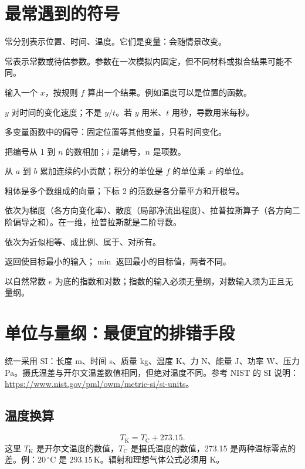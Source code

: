 \documentclass[UTF8,zihao=-4,openany,oneside,fontset=windows]{ctexbook}
\begin{document}
\section{最常遇到的符号}
\begin{description}[style=nextline]
\item[$x,t,T$] 常分别表示位置、时间、温度。它们是变量：会随情景改变。
\item[$a,k,\theta$] 常表示常数或待估参数。参数在一次模拟内固定，但不同材料或拟合结果可能不同。
\item[$f(x)$] 输入一个 $x$，按规则 $f$ 算出一个结果。例如温度可以是位置的函数。
\item[$\mathrm{d}y/\mathrm{d}t$] $y$ 对时间的变化速度；不是 $y/t$。若 $y$ 用米、$t$ 用秒，导数用米每秒。
\item[$\partial T/\partial t$] 多变量函数中的偏导：固定位置等其他变量，只看时间变化。
\item[$\sum_{i=1}^{n}a_i$] 把编号从 1 到 $n$ 的数相加；$i$ 是编号，$n$ 是项数。
\item[$\int_a^b f(x)\,\mathrm{d}x$] 从 $a$ 到 $b$ 累加连续的小贡献；积分的单位是 $f$ 的单位乘 $x$ 的单位。
\item[$\boldsymbol{x},\|\boldsymbol{x}\|_2$] 粗体是多个数组成的向量；下标 2 的范数是各分量平方和开根号。
\item[$\nabla f,\nabla\cdot\boldsymbol{v},\nabla^2 f$] 依次为梯度（各方向变化率）、散度（局部净流出程度）、拉普拉斯算子（各方向二阶偏导之和）。在一维，拉普拉斯就是二阶导数。
\item[$\approx,\propto,\in,\forall$] 依次为近似相等、成比例、属于、对所有。
\item[$\arg\min$] 返回使目标最小的输入；$\min$ 返回最小的目标值，两者不同。
\item[$\exp(z),\ln z$] 以自然常数 $e$ 为底的指数和对数；指数的输入必须无量纲，对数输入须为正且无量纲。
\end{description}

\section{单位与量纲：最便宜的排错手段}
统一采用 SI：长度 m、时间 s、质量 kg、温度 K、力 N、能量 J、功率 W、压力 Pa。摄氏温差与开尔文温差数值相同，但绝对温度不同。参考 NIST 的 SI 说明：\url{https://www.nist.gov/pml/owm/metric-si/si-units}。
\subsection{温度换算}
\begin{equation}T_{\mathrm K}=T_{\mathrm C}+273.15.\end{equation}
这里 $T_{\mathrm K}$ 是开尔文温度的数值，$T_{\mathrm C}$ 是摄氏温度的数值，273.15 是两种温标零点的差。例：$20\,^{\circ}\mathrm C$ 是 $293.15\,\mathrm K$。辐射和理想气体公式必须用 K。
\end{document}
